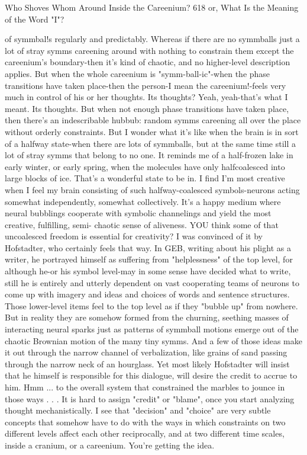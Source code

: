 Who Shoves Whom Around Inside the Careenium?                                         618
or, What Is the Meaning of the Word "I"?

  of symmbal!s regularly and predictably. Whereas if there are no symmballs just a
  lot of stray symms careening around with nothing to constrain them except the
  careenium's boundary-then it's kind of chaotic, and no higher-level description
  applies. But when the whole careenium is "symm-ball-ic"-when the phase
  transitions have taken place-then the person-I mean the careenium!-feels very
  much in control of his or her thoughts.
\tortoise Its thoughts?
\achilles Yeah, yeah-that's what I meant. Its thoughts. But when not enough phase
  transitions have taken place, then there's an indescribable hubbub: random symms
  careening all over the place without orderly constraints. But I wonder what it's like
  when the brain is in sort of a halfway state-when there are lots of symmballs, but at
  the same time still a lot of stray symms that belong to no one. It reminds me of a
  half-frozen lake in early winter, or early spring, when the molecules have only
  halfcoalesced into large blocks of ice.
\tortoise That's a wonderful state to be in. I find I'm most creative when I feel my
  brain consisting of such halfway-coalesced symbols-neurons acting somewhat
  independently, somewhat collectively. It's a happy medium where neural bubblings
  cooperate with symbolic channelings and yield the most creative, fulfilling, semi-
  chaotic sense of aliveness.
\achilles YOU think some of that uncoalesced freedom is essential for creativity?
\tortoise I was convinced of it by Hofstadter, who certainly feels that way. In
  GEB, writing about his plight as a writer, he portrayed himself as suffering from
  "helplessness" of the top level, for although he-or his symbol level-may in some
  sense have decided what to write, still he is entirely and utterly dependent on vast
  cooperating teams of neurons to come up with imagery and ideas and choices of
  words and sentence structures. Those lower-level items feel to the top level as if
  they "bubble up" from nowhere. But in reality they are somehow formed from the
  churning, seething masses of interacting neural sparks just as patterns of symmball
  motions emerge out of the chaotic Brownian motion of the many tiny symms. And
  a few of those ideas make it out through the narrow channel of verbalization, like
  grains of sand passing through the narrow neck of an hourglass. Yet most likely
  Hofstadter will insist that he himself is responsible for this dialogue, will desire the
  credit to accrue to him.
\achilles Hmm ... to the overall system that constrained the marbles to jounce in
  those ways . . . It is hard to assign "credit" or "blame", once you start analyzing
  thought mechanistically. I see that "decision" and "choice" are very subtle concepts
  that somehow have to do with the ways in which constraints on two different levels
  affect each other reciprocally, and at two different time scales, inside a cranium, or
  a careenium.
\tortoise You're getting the idea.




